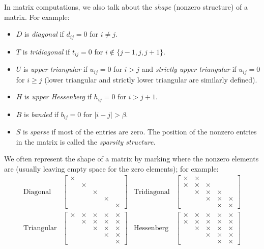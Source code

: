 \documentclass[12pt, leqno]{article}
\begin{document}
In matrix computations, we also talk about the {\em shape} (nonzero
structure) of a matrix.  For example:
\begin{itemize}
\item $D$ is {\em diagonal} if $d_{ij} = 0$ for $i \neq j$.
\item $T$ is {\em tridiagonal} if $t_{ij} = 0$ for $i \not \in \{j-1,
  j, j+1\}$.
\item $U$ is {\em upper triangular} if $u_{ij} = 0$ for $i > j$
  and {\em strictly upper triangular} if $u_{ij} = 0$ for $i \geq j$
  (lower triangular and strictly lower triangular are similarly
  defined).
\item $H$ is {\em upper Hessenberg} if $h_{ij} = 0$ for $i > j+1$.
\item $B$ is {\em banded} if $b_{ij} = 0$ for $|i-j| > \beta$.
\item $S$ is {\em sparse} if most of the entries are zero.  The
  position of the nonzero entries in the matrix is called the
  {\em sparsity structure}.
\end{itemize}
We often represent the shape of a matrix by marking where the nonzero
elements are (usually leaving empty space for the zero elements); for
example:
\begin{align*}
  \mbox{Diagonal} &
  \begin{bmatrix}
    \times & & & & \\
    & \times & & & \\
    & & \times & & \\
    & & & \times & \\
    & & & & \times
  \end{bmatrix} &
  \mbox{Tridiagonal} &
  \begin{bmatrix}
    \times & \times & & & \\
    \times & \times & \times & & \\
    & \times & \times & \times & \\
    & & \times & \times & \times \\
    & & & \times & \times
  \end{bmatrix} \\
  \mbox{Triangular} &
  \begin{bmatrix}
    \times & \times & \times & \times & \times \\
    & \times & \times & \times & \times \\
    & & \times & \times & \times \\
    & & & \times & \times \\
    & & & & \times
  \end{bmatrix} &
  \mbox{Hessenberg} &
  \begin{bmatrix}
    \times & \times & \times & \times & \times \\
    \times & \times & \times & \times & \times \\
    & \times & \times & \times & \times \\
    & & \times & \times & \times \\
    & & & \times & \times
  \end{bmatrix} \\
\end{align*}
\end{document}
